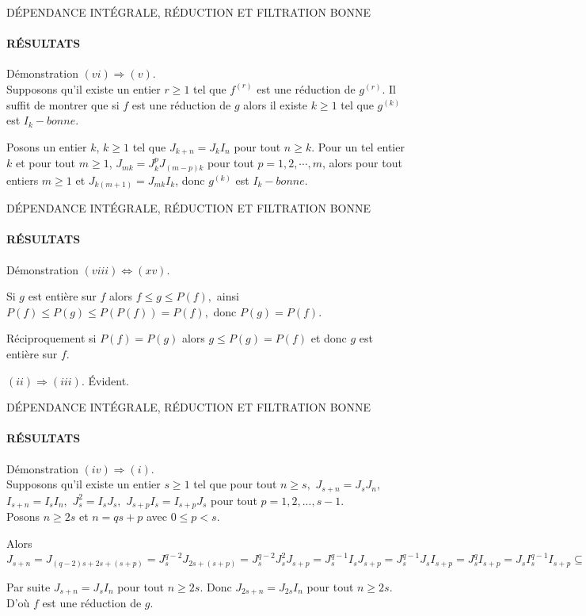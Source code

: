 \documentclass[11pt,a4paper]{beamer}
\begin{document}
\begin{frame}{DÉPENDANCE INTÉGRALE, RÉDUCTION ET FILTRATION BONNE}
	\framesubtitle{RÉSULTATS}
	\begin{block}{Démonstration}
		$(vi)\Longrightarrow (v).$\\ Supposons qu'il existe un entier $r\geq 1$ tel que $f^{(r)}$ est une réduction de $g^{(r)}.$
		Il suffit de montrer que si $f$ est une réduction de $g$ alors il existe 
		$k\geq 1$ tel que $g^{(k)}$ est $I_{k}-bonne.$
		
		Posons un entier $k$, $k \geqslant 1$ tel que $J_{k+n}  = J_{k}I_n$ pour tout $n \geqslant k$. Pour un tel entier $k$ et pour tout $m \geqslant 1$, $J_{mk}=J_{k}^{p}J_{(m-p)k}
		$ pour tout $p=1,2,\cdots,m$, alors pour tout entiers $m\geq 1$ et  $J_{k(m+1)}=J_{mk}I_{k}$, donc $g^{(k)}$ est $I_{k}-bonne.$
	\end{block}
\end{frame}

\begin{frame}{DÉPENDANCE INTÉGRALE, RÉDUCTION ET FILTRATION BONNE}
	\framesubtitle{RÉSULTATS}
	\begin{block}{Démonstration}
		$(viii)\Longleftrightarrow (xv).$
		
		Si $g$ est entière sur $f$ alors $f\leq g\leq P(f),$ ainsi $P(f)\leq P(g)\leq P(P(f))=P(f),$ donc $P(g)=P(f).$
		
		Réciproquement si $P(f)=P(g)$ alors $g\leq P(g)=P(f)$ et donc $g$ est entière sur $f.$
		
		$(ii)\Longrightarrow (iii).$
		Évident.
	\end{block}
\end{frame}

\begin{frame}{DÉPENDANCE INTÉGRALE, RÉDUCTION ET FILTRATION BONNE}
	\framesubtitle{RÉSULTATS}
	\begin{block}{Démonstration}
		$(iv)\Longrightarrow (i).$\\
		Supposons qu'il existe un entier $s\geq 1$ tel que pour tout $n\geq s,$ $J_{s+n}=J_{s}J_{n},$ $I_{s+n}=I_{s}I_{n},$ $J_{s}^{2}=I_{s}J_{s},$ $J_{s+p}I_{s}=I_{s+p}J_{s}$ pour tout $p=1,2,...,s-1$.\\
		Posons $n\geq 2s$ et $n=qs+p$ avec $0\leq p<s.$
		
		Alors $J_{s+n}=J_{(q-2)s+2s+(s+p)}=J_{s}^{q-2}J_{2s+(s+p)}=J_{s}^{q-2}J_{s}^{2}J_{s+p}=J_{s}^{q-1}I_{s}J_{s+p}=J_{s}^{q-1}J_{s}I_{s+p}=J_{s}^{q}I_{s+p}=J_{s}I_{s}^{q-1}I_{s+p}\subseteq J_{s}I_{n}\subseteq J_{s+n}.
		$
		
		Par suite $J_{s+n}=J_{s}I_{n}$ pour tout $n\geq 2s.$ Donc $
		J_{2s+n}=J_{2s}I_{n}$ pour tout $n\geq 2s.$ D'où $f$ est une réduction de $g.$
		
		
		
	\end{block}
\end{frame}
\end{document}
